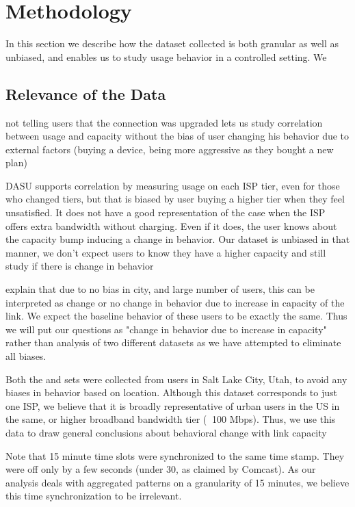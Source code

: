 \section{Methodology}
\label{sec:methodology}

In this section we describe how the dataset collected is both granular as well as unbiased, and enables us to study usage behavior in a controlled setting. We 

\subsection{Relevance of the Data}

not telling users that the connection was upgraded lets us study correlation between usage and capacity without the bias of user changing his behavior due to external factors (buying a device, being more aggressive as they bought a new plan)


DASU supports correlation by measuring usage on each ISP tier, even for those who changed tiers, but that is biased by user buying a higher tier when they feel unsatisfied. It does not have a good representation of the case when the ISP offers extra bandwidth without charging. Even if it does, the user knows about the capacity bump inducing a change in behavior. Our dataset is unbiased in that manner, we don't expect users to know they have a higher capacity and still study if there is change in behavior


 explain that due to no bias in city, and large number of users, this can be interpreted as change or no change in behavior due to increase in capacity of the link. We expect the baseline behavior of these users to be exactly the same. Thus we will put our questions as "change in behavior due to increase in capacity" rather than analysis of two different datasets as we have attempted to eliminate all biases.


Both the \test and \control sets were collected from users in Salt Lake City, Utah, to avoid any biases in behavior based on location. Although this dataset corresponds to just one ISP, we believe that it is broadly representative of urban users in the US in the same, or higher broadband bandwidth tier ($\>$ 100 Mbps). Thus, we use this data to draw general conclusions about behavioral change with link capacity 

Note that 15 minute time slots were synchronized to the same time stamp. They were off only by a few seconds (under 30, as claimed by Comcast). As our analysis deals with aggregated patterns on a granularity of 15 minutes, we believe this time synchronization to be irrelevant.





